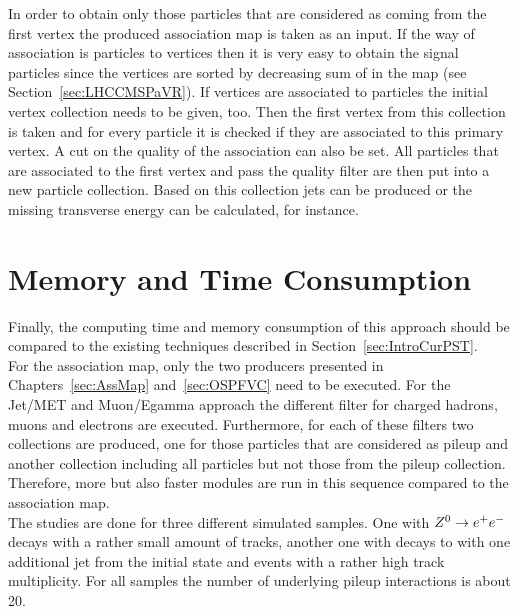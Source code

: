 In order to obtain only those particles that are considered as coming from the first vertex the produced association map is taken as an input. If the way of association is particles to vertices then it is very easy to obtain the signal particles since the vertices are sorted by decreasing sum of \pt in the map (see Section~\ref{sec:LHCCMSPaVR}). If vertices are associated to particles the initial vertex collection needs to be given, too. Then the first vertex from this collection is taken and for every particle it is checked if they are associated to this primary vertex. A cut on the quality of the association can also be set. All particles that are associated to the first vertex and pass the quality filter are then put into a new particle collection. Based on this collection jets can be produced or the missing transverse energy can be calculated, for instance.

\section{Memory and Time Consumption \label{sec:OSPMemTime}}
Finally, the computing time and memory consumption of this approach should be compared to the existing techniques described in Section~\ref{sec:IntroCurPST}. \\
For the association map, only the two producers presented in Chapters~\ref{sec:AssMap} and~\ref{sec:OSPFVC} need to be executed. For the Jet/MET and Muon/Egamma approach the different filter for charged hadrons, muons and electrons are executed. Furthermore, for each of these filters two collections are produced, one for those particles that are considered as pileup and another collection including all particles but not those from the pileup collection. Therefore, more but also faster modules are run in this sequence compared to the association map. \\
The studies are done for three different simulated samples. One with ${Z^{0}}\rightarrow e^+e^-$ decays with a rather small amount of tracks, another one with \Zz decays to \MM with one additional jet from the initial state and \ttbar events with a rather high track multiplicity. For all samples the number of underlying pileup interactions is about 20. \\




